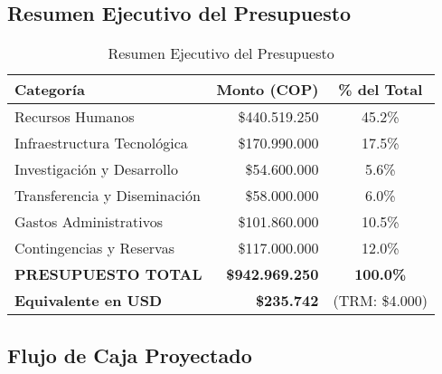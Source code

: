 \subsection{Resumen Ejecutivo del Presupuesto}

\begin{table}[H]
    \centering
    \caption{Resumen Ejecutivo del Presupuesto}
    \label{tab:resumen_presupuesto}
    \small
    \begin{tabular}{|l|r|c|}
        \hline
        \textbf{Categoría} & \textbf{Monto (COP)} & \textbf{\% del Total} \\
        \hline
        Recursos Humanos & \$440.519.250 & 45.2\% \\
        \hline
        Infraestructura Tecnológica & \$170.990.000 & 17.5\% \\
        \hline
        Investigación y Desarrollo & \$54.600.000 & 5.6\% \\
        \hline
        Transferencia y Diseminación & \$58.000.000 & 6.0\% \\
        \hline
        Gastos Administrativos & \$101.860.000 & 10.5\% \\
        \hline
        Contingencias y Reservas & \$117.000.000 & 12.0\% \\
        \hline
        \textbf{PRESUPUESTO TOTAL} & \textbf{\$942.969.250} & \textbf{100.0\%} \\
        \hline
        \textbf{Equivalente en USD} & \textbf{\$235.742} & (TRM: \$4.000) \\
        \hline
    \end{tabular}
\end{table}

\subsection{Flujo de Caja Proyectado}

